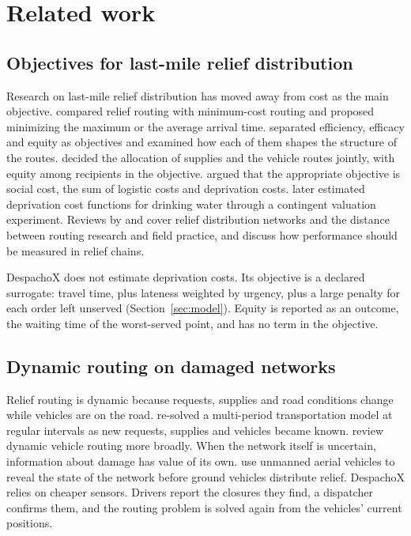 \documentclass[11pt]{article}
\begin{document}
\section{Related work}\label{sec:related}

\subsection{Objectives for last-mile relief distribution}

Research on last-mile relief distribution has moved away from cost as the main objective. \citet{campbell2008routing} compared relief routing with minimum-cost routing and proposed minimizing the maximum or the average arrival time. \citet{huang2012relief} separated efficiency, efficacy and equity as objectives and examined how each of them shapes the structure of the routes. \citet{balcik2008lastmile} decided the allocation of supplies and the vehicle routes jointly, with equity among recipients in the objective. \citet{holguinveras2013objective} argued that the appropriate objective is social cost, the sum of logistic costs and deprivation costs. \citet{holguinveras2016deprivation} later estimated deprivation cost functions for drinking water through a contingent valuation experiment. Reviews by \citet{anayaarenas2014relief} and \citet{delatorre2012disaster} cover relief distribution networks and the distance between routing research and field practice, and \citet{beamon2008performance} discuss how performance should be measured in relief chains.

DespachoX does not estimate deprivation costs. Its objective is a declared surrogate: travel time, plus lateness weighted by urgency, plus a large penalty for each order left unserved (Section~\ref{sec:model}). Equity is reported as an outcome, the waiting time of the worst-served point, and has no term in the objective.

\subsection{Dynamic routing on damaged networks}

Relief routing is dynamic because requests, supplies and road conditions change while vehicles are on the road. \citet{ozdamar2004emergency} re-solved a multi-period transportation model at regular intervals as new requests, supplies and vehicles became known. \citet{pillac2013review} review dynamic vehicle routing more broadly. When the network itself is uncertain, information about damage has value of its own. \citet{escribanomacias2020endogenous} use unmanned aerial vehicles to reveal the state of the network before ground vehicles distribute relief. DespachoX relies on cheaper sensors. Drivers report the closures they find, a dispatcher confirms them, and the routing problem is solved again from the vehicles' current positions.
\end{document}
